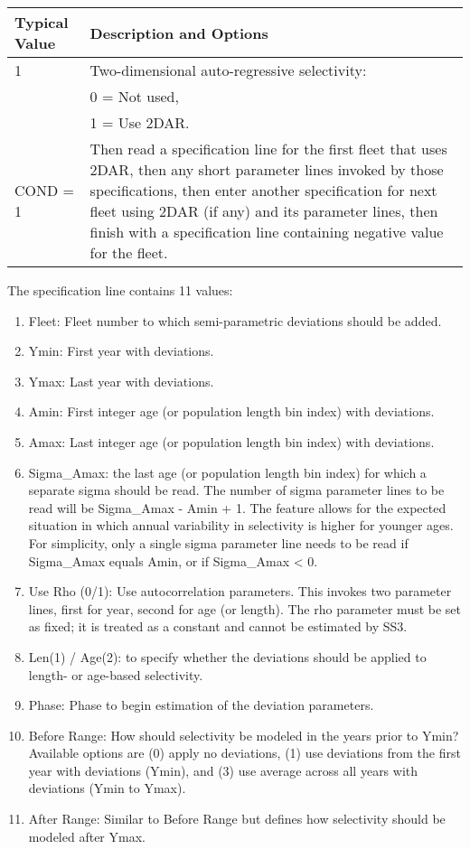 \begin{tabular}{p{2cm} p{14cm}}
	\hline
	Typical Value & Description and Options \Tstrut\Bstrut\\
	\hline
	1 \Tstrut & Two-dimensional auto-regressive selectivity: \\
	  & 0 = Not used, \\
	  & 1 = Use 2DAR. \\
	COND = 1 & Then read a specification line for the first fleet that uses 2DAR, then any short parameter lines invoked by those specifications, then enter another specification for next fleet using 2DAR (if any) and its parameter lines, then finish with a specification line containing negative value for the fleet. \Bstrut\\
	\hline
\end{tabular}

The specification line contains 11 values:
\begin{enumerate}
	\item Fleet: Fleet number to which semi-parametric deviations should be added.
	\item Ymin: First year with deviations.
	\item Ymax: Last year with deviations.
	\item Amin: First integer age (or population length bin index) with deviations.
	\item Amax: Last integer age (or population length bin index) with deviations.
	\item Sigma\_Amax: the last age (or population length bin index) for which a separate sigma should be read. The number of sigma parameter lines to be read will be Sigma\_Amax - Amin + 1. The feature allows for the expected situation in which annual variability in selectivity is higher for younger ages. For simplicity, only a single sigma parameter line needs to be read if Sigma\_Amax equals Amin, or if Sigma\_Amax < 0.
	\item Use Rho (0/1): Use autocorrelation parameters. This invokes two parameter lines, first for year, second for age (or length). The rho parameter must be set as fixed; it is treated as a constant and cannot be estimated by SS3.
	\item Len(1) / Age(2): to specify whether the deviations should be applied to length- or age-based selectivity.
	\item Phase: Phase to begin estimation of the deviation parameters.
	\item Before Range: How should selectivity be modeled in the years prior to Ymin? Available options are (0) apply no deviations, (1) use deviations from the first year with deviations (Ymin), and (3) use average across all years with deviations (Ymin to Ymax).
	\item After Range: Similar to Before Range but defines how selectivity should be modeled after Ymax.
\end{enumerate}


